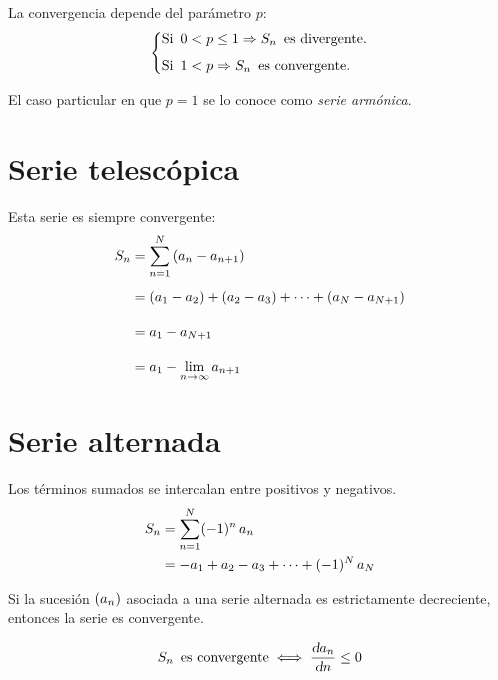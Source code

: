 La convergencia depende del parámetro $p$:
\begin{equation*}
    \left\{
    \begin{aligned}
        & \textrm{Si} \enspace 0 < p \leq 1 \Rightarrow S_n \enspace \textrm{es divergente.}
        \\[1ex]
        & \textrm{Si} \enspace 1 < p \Rightarrow S_n \enspace \textrm{es convergente.}
    \end{aligned}
    \right.
\end{equation*}

El caso particular en que $p=1$ se lo conoce como \emph{serie armónica}.


\section{Serie telescópica}

Esta serie es siempre convergente:
\begin{align*}
    S_n &= \sum_{n=1}^N \left( a_n - a_{n+1} \right)
    \\[1ex]
    &= (a_1-a_2) + (a_2 - a_3) + \dots + (a_N - a_{N+1})
    \\[1em]
    &= a_1 - a_{N+1}
    \\[1em]
    &= a_1 - \lim_{n\to\infty} a_{n+1}
\end{align*}


\section{Serie alternada}

Los términos sumados se intercalan entre positivos y negativos.
\begin{align*}
    S_n &= \sum_{n=1}^N (-1)^n \, a_n
    \\
    &= -a_1 + a_2 - a_3 + \dots + (-1)^N \, a_N
\end{align*}

Si la sucesión $(a_n)$ asociada a una serie alternada es estrictamente decreciente, entonces la serie es convergente.

\begin{mdframed}[style=PropertyFrame]
    \begin{prop}
    \end{prop}
    \begin{equation*}
        S_n \enspace \textrm{es convergente} \iff \frac{\textsl{d} a_n}{\textsl{d} n} \leq 0
    \end{equation*}
\end{mdframed}


